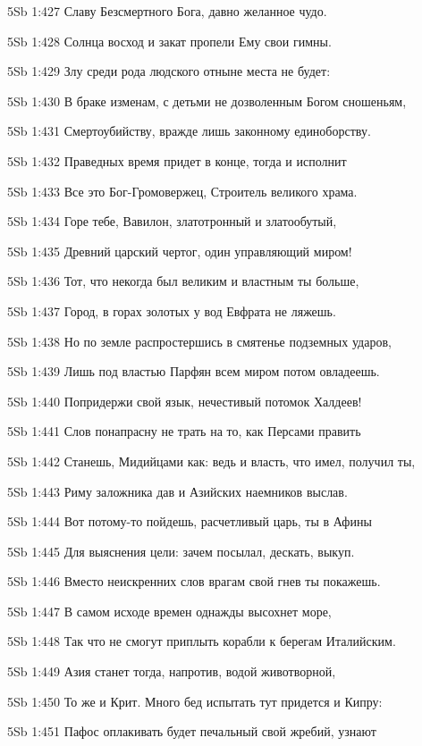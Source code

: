 \vs 5Sb 1:427 Славу Безсмертного Бога, давно желанное чудо. 

\vs 5Sb 1:428 Солнца восход и закат пропели Ему свои гимны. 

\vs 5Sb 1:429 Злу среди рода людского отныне места не будет:

\vs 5Sb 1:430 В браке изменам, с детьми не дозволенным Богом сношеньям,

\vs 5Sb 1:431 Смертоубийству, вражде  лишь законному единоборству. 

\vs 5Sb 1:432 Праведных время придет в конце, тогда и исполнит 

\vs 5Sb 1:433 Все это Бог-Громовержец, Строитель великого храма.

\vs 5Sb 1:434 Горе тебе, Вавилон, златотронный и златообутый, 

\vs 5Sb 1:435 Древний царский чертог, один управляющий миром!

\vs 5Sb 1:436 Тот, что некогда был великим и властным  ты больше,

\vs 5Sb 1:437 Город, в горах золотых у вод Евфрата не ляжешь.

\vs 5Sb 1:438 Но по земле распростершись в смятенье подземных ударов,

\vs 5Sb 1:439 Лишь под властью Парфян всем миром потом овладеешь. 

\vs 5Sb 1:440 Попридержи свой язык, нечестивый потомок Халдеев!

\vs 5Sb 1:441 Слов понапрасну не трать на то, как Персами править

\vs 5Sb 1:442 Станешь, Мидийцами как: ведь и власть, что имел, получил ты,

\vs 5Sb 1:443 Риму заложника дав и Азийских наемников выслав.

\vs 5Sb 1:444 Вот потому-то пойдешь, расчетливый царь, ты в Афины 

\vs 5Sb 1:445 Для выяснения цели: зачем посылал, дескать, выкуп.

\vs 5Sb 1:446 Вместо неискренних слов врагам свой гнев ты покажешь.

\vs 5Sb 1:447 В самом исходе времен однажды высохнет море, 

\vs 5Sb 1:448 Так что не смогут приплыть корабли к берегам Италийским. 

\vs 5Sb 1:449 Азия станет тогда, напротив, водой животворной, 

\vs 5Sb 1:450 То же и Крит. Много бед испытать тут придется и Кипру: 

\vs 5Sb 1:451 Пафос оплакивать будет печальный свой жребий, узнают 

